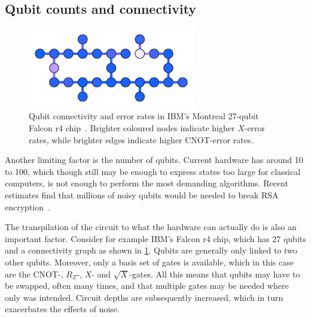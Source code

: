 \subsection{Qubit counts and connectivity}
\label{sec:qubit_counts}
\begin{figure}
  \centering
  \includegraphics[width=0.65\textwidth]{connectivity.pdf}
  \caption[
    Qubit connectivity and error rates example.
  ]{
    Qubit connectivity and error rates in IBM's Montreal 27-qubit Falcon r4 chip~\autocite{connectivity}.
    Brighter coloured nodes indicate higher $X$-error rates, while brighter edges indicate higher CNOT-error rates.
  }
  \label{fig:connectivity}
\end{figure}

Another limiting factor is the number of qubits.
Current hardware has around 10 to 100, which though still may be enough to express states too large for classical computers, is not enough to perform the most demanding algorithms.
Recent estimates find that millions of noisy qubits would be needed to break RSA encryption~\autocite{gidney2021}.

The transpilation of the circuit to what the hardware can actually do is also an important factor.
Consider for example IBM's Falcon r4 chip, which has 27 qubits and a connectivity graph as shown in \cref{fig:connectivity}.
Qubits are generally only linked to two other qubits.
Moreover, only a basis set of gates is available, which in this case are the CNOT-, $R_Z$-, $X$- and $\sqrt{X}$-gates.
All this means that qubits may have to be swapped, often many times, and that multiple gates may be needed where only was intended.
Circuit depths are subsequently increased, which in turn exacerbates the effects of noise.